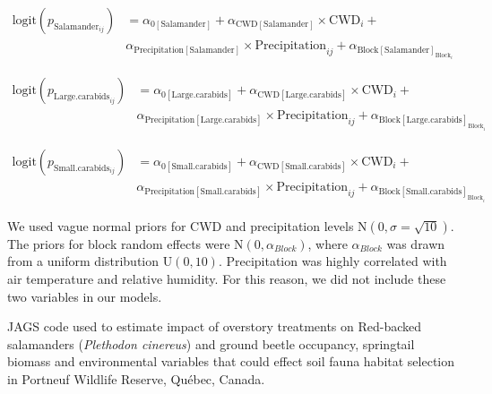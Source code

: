 \begin{align}
  \text{logit}(p_{\text{Salamander}_{ij}}) &= \alpha_{0[\text{Salamander}]} + \alpha_{\text{CWD}[\text{Salamander}]} \times \text{CWD}_i + \nonumber \\
  &\alpha_{\text{Precipitation}[\text{Salamander}]} \times \text{Precipitation}_{ij} + \alpha_{\text{Block}[\text{Salamander}]_{\text{Block}_i}} \nonumber
\end{align}

\begin{align}
  \text{logit}(p_{\text{Large.carabids}_{ij}}) &= \alpha_{0[\text{Large.carabids}]} + \alpha_{\text{CWD}[\text{Large.carabids}]} \times \text{CWD}_i + \\
  &\alpha_{\text{Precipitation}[\text{Large.carabids}]} \times \text{Precipitation}_{ij} + \alpha_{\text{Block}[\text{Large.carabids}]_{\text{Block}_i}} \nonumber 
\end{align}

\begin{align}
  \text{logit}(p_{\text{Small.carabids}_{ij}}) &= \alpha_{0[\text{Small.carabids}]} + \alpha_{\text{CWD}[\text{Small.carabids}]} \times \text{CWD}_i + \nonumber \\
  &\alpha_{\text{Precipitation}[\text{Small.carabids}]} \times \text{Precipitation}_{ij} + \alpha_{\text{Block}[\text{Small.carabids}]_{\text{Block}_i}} \nonumber 
\end{align}


We used vague normal priors for CWD and precipitation levels $\text{N}(0, \sigma = \sqrt{10})$. 
The priors for block random effects were $\text{N}(0, \alpha_{Block})$, where $\alpha_{Block}$ was drawn from a uniform distribution $\text{U}(0, 10)$. 
Precipitation was highly correlated with air temperature and relative humidity. 
For this reason, we did not include these two variables in our models.

\clearpage


\begin{table}[ht]
\caption[JAGS code used to estimate impact of overstory treatments on Red-backed salamanders (\textit{Plethodon cinereus}) and ground beetle occupancy, springtail biomass and environmental variables that could effect soil fauna habitat selection.]
    {JAGS code used to estimate impact of overstory treatments on Red-backed salamanders (\textit{Plethodon cinereus}) and ground beetle occupancy, springtail biomass and environmental variables that could effect soil fauna habitat selection in Portneuf Wildlife Reserve, Québec, Canada.}
    \label{ann:SEM_script}
\end{table}

